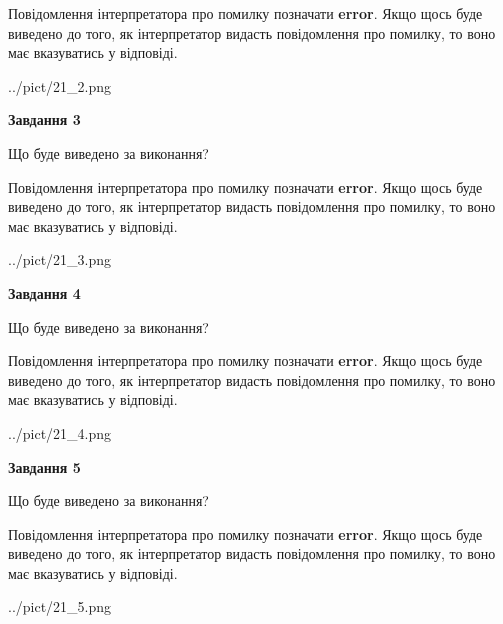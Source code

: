 \documentclass[12pt, ukrainian]{article}
\begin{document}
{\begin {large}
Повідомлення інтерпретатора про помилку позначати \textbf{error}.
Якщо щось буде виведено до того, як інтерпретатор видасть повідомлення про помилку, 
то воно має вказуватись у відповіді. \par


\begin{center}
	{../pict/21_2.png}
\end{center}
\newpage

{\begin {center}\textbf{Завдання 3}\end {center}}\par
Що буде виведено за виконання?

Повідомлення інтерпретатора про помилку позначати \textbf{error}.
Якщо щось буде виведено до того, як інтерпретатор видасть повідомлення про помилку, 
то воно має вказуватись у відповіді. \par


\begin{center}
	{../pict/21_3.png}
\end{center}
\newpage

{\begin {center}\textbf{Завдання 4}\end {center}}\par
Що буде виведено за виконання?

Повідомлення інтерпретатора про помилку позначати \textbf{error}.
Якщо щось буде виведено до того, як інтерпретатор видасть повідомлення про помилку, 
то воно має вказуватись у відповіді. \par


\begin{center}
	{../pict/21_4.png}
\end{center}
\newpage

{\begin {center}\textbf{Завдання 5}\end {center}}\par
Що буде виведено за виконання?

Повідомлення інтерпретатора про помилку позначати \textbf{error}.
Якщо щось буде виведено до того, як інтерпретатор видасть повідомлення про помилку, 
то воно має вказуватись у відповіді. \par


\begin{center}
	{../pict/21_5.png}
\end{center}
\newpage


\end{large}}
\end{document}
